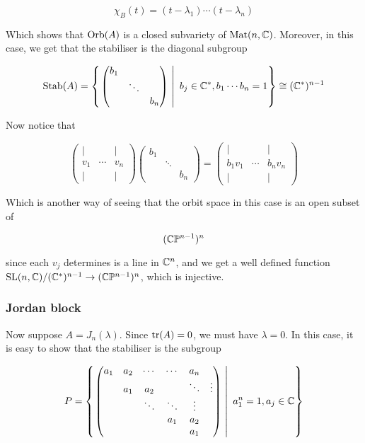 \documentclass{article}
\begin{document}
\[\chi_B(t) = (t - \lambda_1)\cdots(t - \lambda_n)\]

Which shows that \(\operatorname{Orb}(A)\) is a closed subvariety of \(\operatorname{Mat}(n, \mathbb{C})\). Moreover, in this case, we get that the stabiliser is the diagonal subgroup

\[\operatorname{Stab}(A) = \left\{\left.\begin{pmatrix}
    b_1 & \\
    & \ddots \\
    & & b_n
\end{pmatrix}\ \right\vert\ b_j \in \mathbb{C}^*, b_1\cdots b_n = 1 \right\} \cong (\mathbb{C}^*)^{n-1}\]

Now notice that

\[\begin{pmatrix}
    \vert & & \vert \\
    v_1 & \cdots & v_n \\
    \vert & & \vert
\end{pmatrix}\begin{pmatrix}
    b_1 & \\
    & \ddots \\
    & & b_n
\end{pmatrix} = \begin{pmatrix}
    \vert & & \vert \\
    b_1v_1 & \cdots & b_nv_n \\
    \vert & & \vert
\end{pmatrix}\]

Which is another way of seeing that the orbit space in this case is an open subset of

\[(\mathbb{C} \mathbb{P}^{n-1})^n\]

since each \(v_j\) determines is a line in \(\mathbb{C}^n\), and we get a well defined function \(\operatorname{SL}(n, \mathbb{C})/(\mathbb{C}^*)^{n-1} \to (\mathbb{C} \mathbb{P}^{n-1})^n\), which is injective.

\subsubsection{Jordan block}

Now suppose \(A = J_n(\lambda)\). Since \(\tr(A) = 0\), we must have \(\lambda = 0\). In this case, it is easy to show that the stabiliser is the subgroup

\[P = \left\{\left.\begin{pmatrix}
    a_1 & a_2 & \cdots & \cdots & a_n \\
    & a_1 & a_2 & &\ddots & \vdots \\
    & & \ddots & \ddots & \vdots \\
    & & & a_1 & a_2 \\
    & & & & a_1
\end{pmatrix}\ \right\vert\ a_1^n = 1, a_j \in \mathbb{C} \right\}\]
\end{document}
